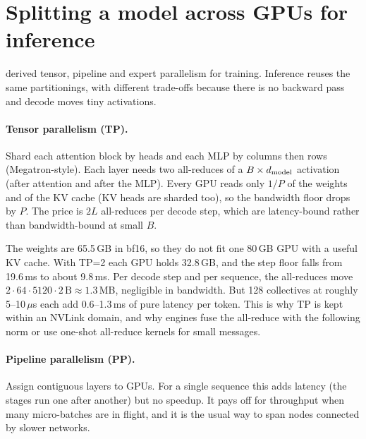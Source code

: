 \section{Splitting a model across GPUs for inference}\label{sec:efficient:parallel}

 derived tensor, pipeline and expert parallelism for training.
Inference reuses the same partitionings, with different trade-offs because there is no
backward pass and decode moves tiny activations.

\paragraph{Tensor parallelism (TP).} Shard each attention block by heads and each MLP by
columns then rows (Megatron-style). Each layer needs two all-reduces of a
$B\times d_{\text{model}}$ activation (after attention and after the MLP). Every GPU reads only
$1/P$ of the weights and of the KV cache (KV heads are sharded too), so the bandwidth
floor drops by $P$. The price is $2L$ all-reduces per decode step, which are
latency-bound rather than bandwidth-bound at small $B$.

\begin{napkinmath}[Qwen3-32B with TP=2 on NVLink]
The weights are 65.5\,GB in bf16, so they do not fit one 80\,GB GPU with a useful KV
cache. With TP=2 each GPU holds 32.8\,GB, and the step floor falls from 19.6\,ms to
about 9.8\,ms. Per decode step and per sequence, the all-reduces move
$2\cdot 64 \cdot 5120 \cdot 2\,\text{B} \approx 1.3$\,MB, negligible in bandwidth. But
128 collectives at roughly 5--10\,$\mu$s each add 0.6--1.3\,ms of pure latency per
token. This is why TP is kept within an NVLink domain, and why engines fuse the
all-reduce with the following norm or use one-shot all-reduce kernels for small
messages.
\end{napkinmath}

\paragraph{Pipeline parallelism (PP).} Assign contiguous layers to GPUs. For a single
sequence this adds latency (the stages run one after another) but no speedup. It pays
off for throughput when many micro-batches are in flight, and it is the usual way to
span nodes connected by slower networks.

